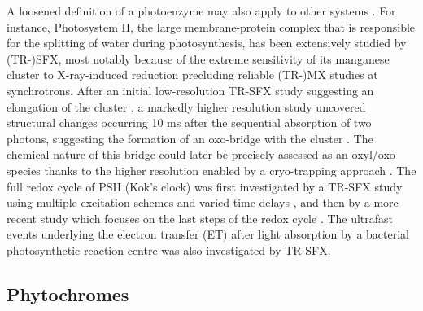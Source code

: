 A loosened definition of a photoenzyme may also apply to other systems \parencite{bjornPhotoenzymesRelatedTopics2018}. For instance, Photosystem II, the large membrane-protein complex that is responsible for the splitting of water during photosynthesis, has been extensively studied by (TR-)SFX, most notably because of the extreme sensitivity of its manganese cluster to X-ray-induced reduction precluding reliable (TR-)MX studies at synchrotrons. After an initial low-resolution TR-SFX study suggesting an elongation of the cluster \parencite{kupitzSerialTimeresolvedCrystallography2014}, a markedly higher resolution study uncovered structural changes occurring 10 ms after the sequential absorption of two photons, suggesting the formation of an oxo-bridge with the cluster \parencite{sugaLightinducedStructuralChanges2017}. The chemical nature of this bridge could later be precisely assessed as an oxyl/oxo species thanks to the higher resolution enabled by a cryo-trapping approach \parencite{sugaOxylOxoMechanism2019}. The full redox cycle of PSII (Kok’s clock) was first investigated by a TR-SFX study using multiple excitation schemes and varied time delays \parencite{kernStructuresIntermediatesKok2018}, and then by a more recent study which focuses on the last steps of the redox cycle \parencite{bhowmickStructuralEvidenceIntermediates2023}. The ultrafast events underlying the electron transfer (ET) after light absorption by a bacterial photosynthetic reaction centre was also investigated by TR-SFX\parencite{dodsUltrafastStructuralChanges2021}.

\subsection{Phytochromes}

